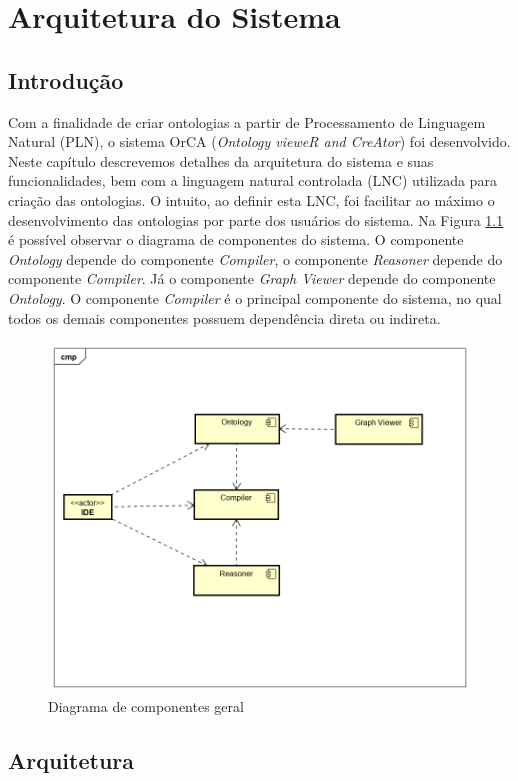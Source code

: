 \documentclass{bcc}
\begin{document}
\chapter{Arquitetura do Sistema}
\label{chap:sistema}

\section{Introdução}
Com a finalidade de criar ontologias a partir de Processamento de Linguagem Natural (PLN), o sistema OrCA (\textit{Ontology vieweR and CreAtor}) foi desenvolvido. Neste capítulo descrevemos detalhes da arquitetura do sistema e suas funcionalidades, bem com a linguagem natural controlada (LNC) utilizada para criação das ontologias. O intuito, ao definir esta LNC, foi facilitar ao máximo o desenvolvimento das ontologias por parte dos usuários do sistema. Na Figura \ref{fig:diagComponenteGeral} é possível observar o diagrama de componentes do sistema. O componente \textit{Ontology} depende do componente \textit{Compiler}, o componente \textit{Reasoner} depende do componente \textit{Compiler}. Já o componente \textit{Graph Viewer} depende do componente \textit{Ontology}. O componente \textit{Compiler} é o principal componente do sistema, no qual todos os demais componentes possuem dependência direta ou indireta.

\begin{figure}[H]
\centering
\includegraphics[width=.63\textwidth]{Figuras/DiagramadeComponentes.png}
\caption{Diagrama de componentes geral}
\label{fig:diagComponenteGeral}
\end{figure}

\section{Arquitetura}
\end{document}
